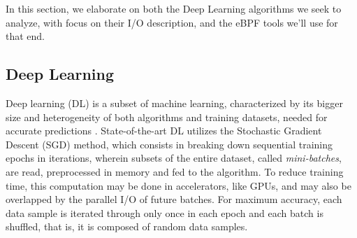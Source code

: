 \documentclass[conference]{IEEEtran}
\begin{document}


In this section, we elaborate on both the Deep Learning algorithms we seek to analyze, with focus on their I/O description, and the eBPF tools we'll use for that end.

\subsection{Deep Learning}

Deep learning (DL) is a subset of machine learning, characterized by its bigger size and heterogeneity of both algorithms and training datasets, needed for accurate predictions \cite{gradient}. State-of-the-art DL utilizes the Stochastic Gradient Descent (SGD) method, which consists in breaking down sequential training epochs in iterations, wherein subsets of the entire dataset, called \textit{mini-batches}, are read, preprocessed in memory and fed to the algorithm. To reduce training time, this computation may be done in accelerators, like GPUs, and may also be overlapped by the parallel I/O of future batches. For maximum accuracy, each data sample is iterated through only once in each epoch and each batch is shuffled, that is, it is composed of random data samples.
\end{document}
